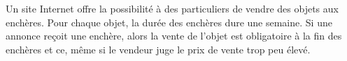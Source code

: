 \documentclass[a4paper,11pt]{article}
\begin{document}
%
%

\bigskip


\medskip

Un site Internet offre la possibilité à des particuliers de vendre des objets aux enchères. Pour chaque objet, la durée des enchères dure une semaine. Si une annonce reçoit une enchère, alors la vente de l'objet est obligatoire à la fin des enchères et ce, même si le vendeur juge le prix de vente trop peu élevé.
\end{document}

